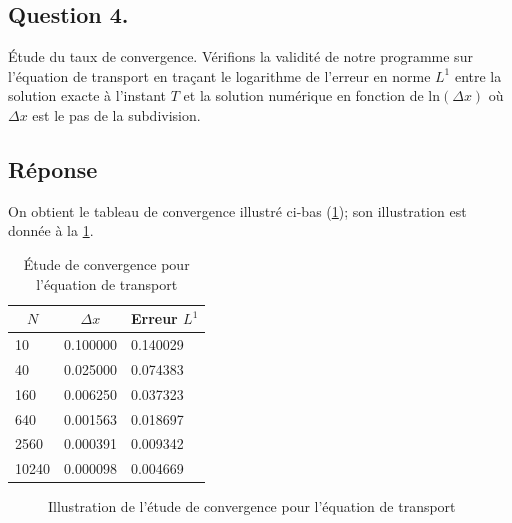 \documentclass[
	french,
	11pt, %
]{fphw}
\begin{document}

\subsection*{Question 4.}
\begin{problem}
	Étude du taux de convergence. Vérifions la validité de notre programme sur l'équation de transport en traçant le logarithme de l'erreur en norme $L^1$ entre la solution exacte à l'instant $T$ et la solution numérique en fonction de $\text{ln}(\Delta x)$ où $\Delta x$ est le pas de la subdivision.
\end{problem}

\subsection*{Réponse}
On obtient le tableau de convergence illustré ci-bas (\cref{table:Transport}); son illustration est donnée à la \cref{fig:TransportCvg}.

\begin{table}[h!]
	\centering
	\renewcommand{\arraystretch}{1.2}
	\begin{tabular}{| m{2cm} | m{2cm} | m{2cm} |} 
	\hline 
	\multicolumn{1}{|c|}{$N$} & \multicolumn{1}{|c|}{$\Delta x$} & \multicolumn{1}{|c|}{Erreur $L^1$} \\ [0.5ex] 
	\hline \hline
	10 & 0.100000 & 0.140029 \\ [0.5ex]
	40 & 0.025000 & 0.074383 \\ [0.5ex]
	160 & 0.006250 & 0.037323 \\ [0.5ex]
	640 & 0.001563 & 0.018697 \\ [0.5ex]
	2560 & 0.000391 & 0.009342 \\ [0.5ex] 
	10240 & 0.000098 & 0.004669 \\ [0.5ex] 
	\hline
   \end{tabular}
	\caption{Étude de convergence pour l'équation de transport}
	\label{table:Transport}
\end{table}


\begin{figure}[H]
	\centering
	\scalebox{.6}{}
	\caption{Illustration de l'étude de convergence pour l'équation de transport}
	\label{fig:TransportCvg}
\end{figure}
\end{document}
